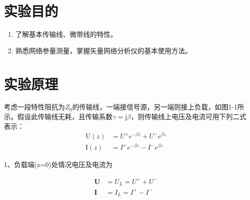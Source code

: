 \documentclass[12pt,hyperref,a4paper,UTF8]{ctexart}
\begin{document}
\cover

%
%

\thispagestyle{empty} %

\newpage
\tableofcontents

\newpage


\section{实验目的}

\begin{enumerate}[itemsep=-5pt, topsep=0pt, partopsep=0pt]
    \item 了解基本传输线、微带线的特性。
    \item 熟悉网络参量测量，掌握矢量网络分析仪的基本使用方法。
\end{enumerate}

\section{实验原理}
考虑一段特性阻抗为$Z_0$的传输线，一端接信号源，另一端则接上负载，如图1-1所示。假设此传输线无耗，且传输系数$\gamma=\mathrm{j}\beta$，则传输线上电压及电流可用下列二式表示：
\begin{equation}\begin{aligned}\mathrm{U}(z)&=U^+e^{-\beta z}+U^-e^{\beta z}\\\mathrm{I}(z)&=I^+e^{-\beta z}-I^-e^{\beta z}\end{aligned}\end{equation}

1、负载端(z=0)处情况电压及电流为

\begin{equation}\begin{aligned}\mathbf{U}&=U_L=U^++U^-\\\mathbf{I}&=I_L=I^+-I^-\end{aligned}\end{equation}
\end{document}
